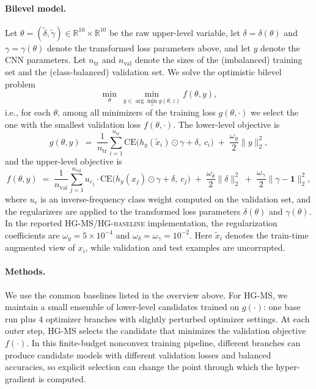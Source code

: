 \documentclass{article}
\theoremstyle{normaltheorem}
\newcommand{\R}{\mathbb{R}}
\begin{document}
\paragraph{Bilevel model.}
Let \(\theta=(\tilde\delta,\tilde\gamma)\in\R^{10}\times\R^{10}\) be the raw upper-level variable, let
\(\delta=\delta(\theta)\) and \(\gamma=\gamma(\theta)\) denote the transformed loss parameters above, and let $y$ denote
the CNN parameters.
Let $n_{\mathrm{tr}}$ and $n_{\mathrm{val}}$ denote the sizes of the (imbalanced) training set and the (class-balanced) validation set.
We solve the optimistic bilevel problem
\[
\min_{\theta}\ \min_{y\in\arg\min_{z} g(\theta,z)} f(\theta,y),
\]
i.e., for each $\theta$, among all minimizers of the training loss $g(\theta,\cdot)$ we select the one with the smallest
validation loss $f(\theta,\cdot)$.
The lower-level objective is
\[
g(\theta,y)\;=\;\frac{1}{n_{\mathrm{tr}}}\sum_{i=1}^{n_{\mathrm{tr}}}\mathrm{CE}\!\big(h_y(\tilde x_i)\odot\gamma+\delta,\ c_i\big)\;+\;\frac{\omega_y}{2}\|y\|_2^2,
\]
and the upper-level objective is
\[
f(\theta,y)\;=\;\frac{1}{n_{\mathrm{val}}}\sum_{j=1}^{n_{\mathrm{val}}}u_{c_j}\cdot \mathrm{CE}\!\big(h_y(x_j)\odot\gamma+\delta,\ c_j\big)\;+\;\frac{\omega_\delta}{2}\|\delta\|_2^2\;+\;\frac{\omega_\gamma}{2}\|\gamma-\mathbf 1\|_2^2,
\]
where $u_c$ is an inverse-frequency class weight computed on the validation set, and the regularizers are applied to the
transformed loss parameters \(\delta(\theta)\) and \(\gamma(\theta)\).
In the reported \textsc{HG-MS}/\textsc{HG-baseline} implementation, the regularization coefficients are
\(\omega_y=5\times10^{-4}\) and \(\omega_\delta=\omega_\gamma=10^{-2}\).
Here $\tilde x_i$ denotes the train-time augmented view of $x_i$, while validation and test examples are uncorrupted.

\paragraph{Methods.}
We use the common baselines listed in the overview above.
For \textsc{HG-MS}, we maintain a small ensemble of lower-level candidates trained on \(g(\cdot)\): one base run plus
\(4\) optimizer branches with slightly perturbed optimizer settings. At each outer step, \textsc{HG-MS} selects the
candidate that minimizes the validation objective \(f(\cdot)\). In this finite-budget nonconvex training pipeline,
different branches can produce candidate models with different validation losses and balanced accuracies, so explicit
selection can change the point through which the hyper-gradient is computed.
\end{document}

